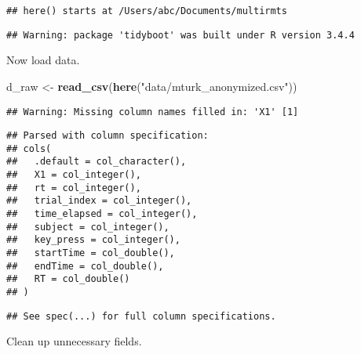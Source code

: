 \documentclass[]{article}
\newenvironment{Shaded}{\begin{snugshade}}{\end{snugshade}}
\newcommand{\KeywordTok}[1]{\textcolor[rgb]{0.13,0.29,0.53}{\textbf{{#1}}}}
\newcommand{\StringTok}[1]{\textcolor[rgb]{0.31,0.60,0.02}{{#1}}}
\newcommand{\NormalTok}[1]{{#1}}
\begin{document}
\begin{verbatim}
## here() starts at /Users/abc/Documents/multirmts
\end{verbatim}

\begin{verbatim}
## Warning: package 'tidyboot' was built under R version 3.4.4
\end{verbatim}

Now load data.

\begin{Shaded}
\begin{Highlighting}[]
\NormalTok{d_raw <-}\StringTok{ }\KeywordTok{read_csv}\NormalTok{(}\KeywordTok{here}\NormalTok{(}\StringTok{"data/mturk_anonymized.csv"}\NormalTok{))}
\end{Highlighting}
\end{Shaded}

\begin{verbatim}
## Warning: Missing column names filled in: 'X1' [1]
\end{verbatim}

\begin{verbatim}
## Parsed with column specification:
## cols(
##   .default = col_character(),
##   X1 = col_integer(),
##   rt = col_integer(),
##   trial_index = col_integer(),
##   time_elapsed = col_integer(),
##   subject = col_integer(),
##   key_press = col_integer(),
##   startTime = col_double(),
##   endTime = col_double(),
##   RT = col_double()
## )
\end{verbatim}

\begin{verbatim}
## See spec(...) for full column specifications.
\end{verbatim}

Clean up unnecessary fields.
\end{document}

